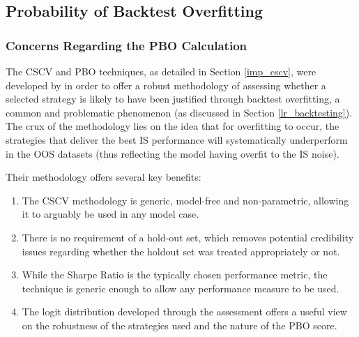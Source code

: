\documentclass[a4paper,11pt,oneside]{article}
\theoremstyle{plain}
\theoremstyle{definition}
\begin{document}
	\newpage

	\subsection{Probability of Backtest Overfitting}\label{results_pbo}
	
	
	\subsubsection{Concerns Regarding the PBO Calculation}\label{results_pboconcerns}
	
	The CSCV and PBO techniques, as detailed in Section \ref{imp_cscv}, were developed by \citet{BailyPBO} in order to offer a robust methodology of assessing whether a selected strategy is likely to have been justified through backtest overfitting, a common and problematic phenomenon (as discussed in Section \ref{lr_backtesting}). The crux of the methodology lies on the idea that for overfitting to occur, the strategies that deliver the best IS performance will systematically underperform in the OOS datasets (thus reflecting the model having overfit to the IS noise).\newline
	
	Their methodology offers several key benefits:
	\begin{enumerate}
		\item The CSCV methodology is generic, model-free and non-parametric, allowing it to arguably be used in any model case.
		\item There is no requirement of a hold-out set, which removes potential credibility issues regarding whether the holdout set was treated appropriately or not.
		\item While the Sharpe Ratio is the typically chosen performance metric, the technique is generic enough to allow any performance measure to be used.
		\item The logit distribution developed through the assessment offers a useful view on the robustness of the strategies used and the nature of the PBO score.
	\end{enumerate}
	
\end{document}
